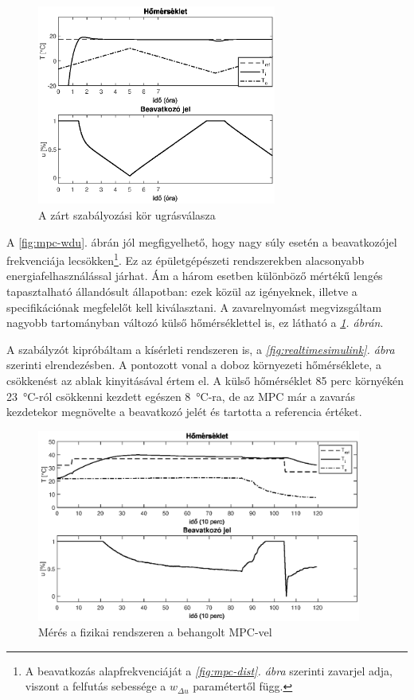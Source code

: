 \begin{figure}[H]
	\centering
	\includegraphics[width=0.7\textwidth]{figures/simscape/distrej}
	\caption{A zárt szabályozási kör ugrásválasza}
	\label{fig:mpc-distrej}
\end{figure}

A \ref{fig:mpc-wdu}. ábrán jól megfigyelhető, hogy nagy súly esetén a beavatkozójel frekvenciája lecsökken\footnote{A beavatkozás alapfrekvenciáját a \textit{\ref{fig:mpc-dist}. ábra} szerinti zavarjel adja, viszont a felfutás sebessége a $w_{\Delta u}$ paramétertől függ.}. Ez az épületgépészeti rendszerekben alacsonyabb energiafelhasználással járhat. Ám a három esetben különböző mértékű lengés tapasztalható állandósult állapotban: ezek közül az igényeknek, illetve a specifikációnak megfelelőt kell kiválasztani. A zavarelnyomást megvizsgáltam nagyobb tartományban változó külső hőmérséklettel is, ez látható a \textit{\ref{fig:mpc-distrej}. ábrán}.

A szabályzót kipróbáltam a kísérleti rendszeren is, a \textit{\ref{fig:realtimesimulink}. ábra} szerinti elrendezésben. A pontozott vonal a doboz környezeti hőmérséklete, a csökkenést az ablak kinyitásával értem el.
A külső hőmérséklet 85 perc környékén \SI{23}{\degreeCelsius}-ról csökkenni kezdett egészen \SI{8}{\degreeCelsius}-ra, de az MPC már a zavarás kezdetekor megnövelte a beavatkozó jelét és tartotta a referencia értéket. 

\begin{figure}[H]
	\centering
	\includegraphics[width=0.95\textwidth]{figures/realsys/step}
	\caption{Mérés a fizikai rendszeren a behangolt MPC-vel}
	\label{fig:mpc-step}
\end{figure}

